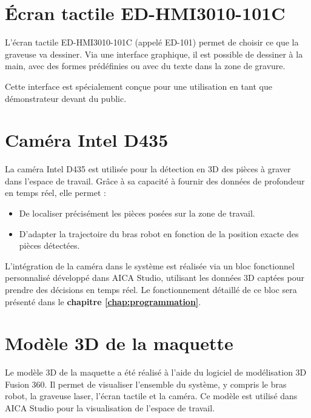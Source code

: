 \section{Écran tactile ED-HMI3010-101C}

L’écran tactile ED-HMI3010-101C (appelé ED-101) permet de choisir ce que la graveuse va dessiner. Via une interface graphique, il est possible de dessiner à la main, avec des formes prédéfinies ou avec du texte dans la zone de gravure.

Cette interface est spécialement conçue pour une utilisation en tant que démonstrateur devant du public.

\section{Caméra Intel D435}

La caméra Intel D435 est utilisée pour la détection en 3D des pièces à graver dans l’espace de travail. Grâce à sa capacité à fournir des données de profondeur en temps réel, elle permet :
\begin{itemize}
    \item De localiser précisément les pièces posées sur la zone de travail.
    \item D’adapter la trajectoire du bras robot en fonction de la position exacte des pièces détectées.
\end{itemize}

L’intégration de la caméra dans le système est réalisée via un bloc fonctionnel personnalisé développé dans AICA Studio, utilisant les données 3D captées pour prendre des décisions en temps réel. Le fonctionnement détaillé de ce bloc sera présenté dans le \textbf{chapitre \ref{chap:programmation}}.

\section{Modèle 3D de la maquette}

Le modèle 3D de la maquette a été réalisé à l'aide du logiciel de modélisation 3D Fusion 360. Il permet de visualiser l'ensemble du système, y compris le bras robot, la graveuse laser, l'écran tactile et la caméra. Ce modèle est utilisé dans AICA Studio pour la visualisation de l'espace de travail.

